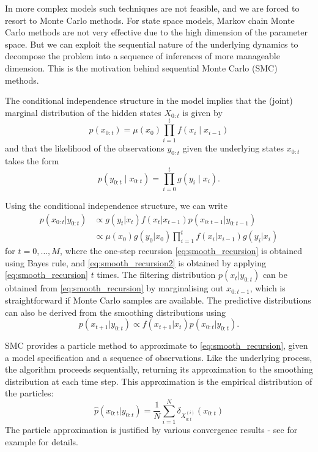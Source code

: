 \documentclass[fleqn]{article}
\theoremstyle{definition}
\begin{document}
In more complex models such techniques are not feasible, and we are forced to resort to Monte Carlo methods.
For state space models, Markov chain Monte Carlo methods are not very effective due to the high dimension of the parameter space. But we can exploit the sequential nature of the underlying dynamics to decompose the problem into a sequence of inferences of more manageable dimension.
This is the motivation behind sequential Monte Carlo (SMC) methods.

The conditional independence structure in the model implies that the (joint) marginal distribution of the hidden states $X_{0:t}$ is given by
\begin{equation*} \label{eq:hmm_marginal}
p(x_{0:t}) = \mu(x_0) \prod_{i=1}^t f(x_i \mid x_{i-1})
\end{equation*}
and that the likelihood of the observations $y_{0:t}$ given the underlying states $x_{0:t}$ takes the form
\begin{equation*} \label{eq:hmm_likelihood}
p(y_{0:t} \mid x_{0:t}) = \prod_{i=0}^t g(y_i \mid x_i).
\end{equation*}

Using the conditional independence structure, we can write
\begin{align}
p(x_{0:t} | y_{0:t}) &\propto g(y_t | x_t) f(x_t | x_{t-1}) p(x_{0:t-1} | y_{0:t-1}) \label{eq:smooth_recursion}\\
&\propto \mu(x_0) g(y_0 | x_0) \prod_{i=1}^t f(x_i | x_{i-1}) g(y_i | x_i) \label{eq:smooth_recursion2}
\end{align}
for $t = 0,\dots,M$, where the one-step recursion \eqref{eq:smooth_recursion} is obtained using Bayes rule, and \eqref{eq:smooth_recursion2} is obtained by applying \eqref{eq:smooth_recursion} $t$ times. 
The filtering distribution $p(x_t | y_{0:t})$ can be obtained from \eqref{eq:smooth_recursion} by marginalising out $x_{0:t-1}$, which is straightforward if Monte Carlo samples are available.
The predictive distributions can also be derived from the smoothing distributions using
\begin{equation*}
p(x_{t+1} | y_{0:t}) \propto f(x_{t+1} | x_t) p(x_{0:t} | y_{0:t}).
\end{equation*}

SMC provides a particle method to approximate to \eqref{eq:smooth_recursion}, given a model specification and a sequence of observations. Like the underlying process, the algorithm proceeds sequentially, returning its approximation to the smoothing distribution at each time step.
This approximation is the empirical distribution of the particles:
\begin{equation}
\hat{p}(x_{0:t}|y_{0:t}) = \frac{1}{N} \sum_{i=1}^N \delta_{X_{0:t}^{(i)}} (x_{0:t})
\end{equation}
The particle approximation is justified by various convergence results - see for example \citet{delmoral2013} for details.
\end{document}
